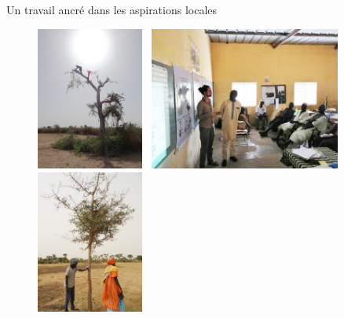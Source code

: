 \documentclass[aspectratio=169]{beamer}
\begin{document}
\begin{frame}{Un travail ancré dans les aspirations locales}
    \begin{center}
        \vspace{-1em}
        \begin{figure}
            \centering
            \includegraphics[height = 4.7cm]{img/emondage_faidherbia.png}~
            \includegraphics[height = 4.7cm]{img/atelierLucas.jpg}~
            \includegraphics[height = 4.7cm]{img/entretienChamp.jpg}
        \end{figure}
    \end{center}
\end{frame}
\end{document}
